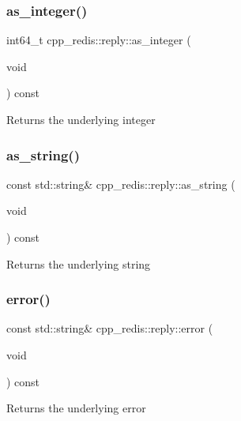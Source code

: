 \subsubsection{\texorpdfstring{as\+\_\+integer()}{as\_integer()}}
{\footnotesize\ttfamily int64\+\_\+t cpp\+\_\+redis\+::reply\+::as\+\_\+integer (\begin{DoxyParamCaption}\item[{void}]{ }\end{DoxyParamCaption}) const}

\begin{DoxyReturn}{Returns}
the underlying integer 
\end{DoxyReturn}
\mbox{\label{classcpp__redis_1_1reply_a5fdd9c1d3bb3b9ece6098f8b83a32597}} 
\subsubsection{\texorpdfstring{as\+\_\+string()}{as\_string()}}
{\footnotesize\ttfamily const std\+::string\& cpp\+\_\+redis\+::reply\+::as\+\_\+string (\begin{DoxyParamCaption}\item[{void}]{ }\end{DoxyParamCaption}) const}

\begin{DoxyReturn}{Returns}
the underlying string 
\end{DoxyReturn}
\mbox{\label{classcpp__redis_1_1reply_a8e4d3fe1636627fdee6361705a2b1c1e}} 
\subsubsection{\texorpdfstring{error()}{error()}}
{\footnotesize\ttfamily const std\+::string\& cpp\+\_\+redis\+::reply\+::error (\begin{DoxyParamCaption}\item[{void}]{ }\end{DoxyParamCaption}) const}

\begin{DoxyReturn}{Returns}
the underlying error 
\end{DoxyReturn}
\mbox{\label{classcpp__redis_1_1reply_ab196726881aea799186228d49a2283ba}} 
